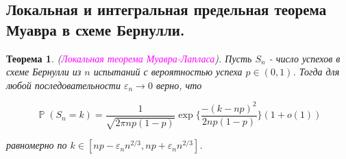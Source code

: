 \documentclass[a4paper,100pt]{article}
\theoremstyle{indented}
\newtheorem{theorem}{Теорема}
\theoremstyle{definition}
\theoremstyle{remark}
\DeclareMathOperator{\ra}{\rightarrow}
\DeclareMathOperator{\PP}{\mathbb{P}}
\begin{document}
\subsection{Локальная и интегральная предельная теорема Муавра в схеме Бернулли.} 

\begin{theorem}
  (\hypertarget{n24}{\textcolor{magenta}{\textit{Локальная теорема Муавра-Лапласа}}}). Пусть $S_n$ - число успехов в схеме Бернулли из $n$ испытаний с вероятностью успеха $p\in(0, 1)$. Тогда для любой последовательности $\varepsilon_n \ra 0$ верно, что 

  \[
    \PP (S_n = k) = \frac{1}{\sqrt{2 \pi n p (1-p)}} \exp \{\frac{-(k - np)^2}{2np(1-p)}\} (1+o(1))
  \]

  равномерно по $k \in [np-\varepsilon_n n^{2/3}, np+\varepsilon_n n^{2/3}]$. 
\end{theorem}
\end{document}

